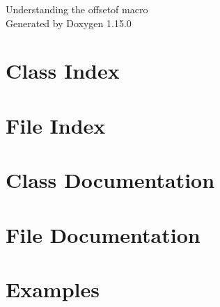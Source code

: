 \documentclass[twoside]{book}
\newcommand{\+}{\discretionary{\mbox{\scriptsize$\hookleftarrow$}}{}{}}
\newcommand{\clearemptydoublepage}{%
    \newpage{\pagestyle{empty}\cleardoublepage}%
  }
\begin{document}
  \raggedbottom
    \hypersetup{pageanchor=false,
                bookmarksnumbered=true,
                pdfencoding=unicode
               }
  \begin{titlepage}
  \vspace*{7cm}
  \begin{center}%
  {\Large Understanding the offsetof macro}\\
  \vspace*{1cm}
  {\large Generated by Doxygen 1.15.0}\\
  \end{center}
  \end{titlepage}
  \clearemptydoublepage
  \tableofcontents
  \clearemptydoublepage
  \hypersetup{pageanchor=true}
\chapter{Class Index}

\chapter{File Index}

\chapter{Class Documentation}

\chapter{File Documentation}





\chapter{Examples}

  \backmatter
  \newpage
  \clearemptydoublepage
  \printindex
\end{document}

